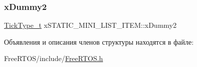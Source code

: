\subsubsection{\texorpdfstring{xDummy2}{xDummy2}}
{\footnotesize\ttfamily \mbox{\hyperlink{portmacro_8h_aa69c48c6e902ce54f70886e6573c92a9}{Tick\+Type\+\_\+t}} x\+S\+T\+A\+T\+I\+C\+\_\+\+M\+I\+N\+I\+\_\+\+L\+I\+S\+T\+\_\+\+I\+T\+E\+M\+::x\+Dummy2}



Объявления и описания членов структуры находятся в файле\+:\begin{DoxyCompactItemize}
\item 
Free\+R\+T\+O\+S/include/\mbox{\hyperlink{_free_r_t_o_s_8h}{Free\+R\+T\+O\+S.\+h}}\end{DoxyCompactItemize}

